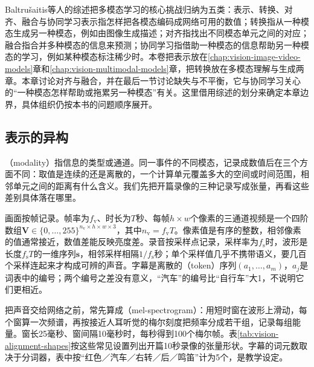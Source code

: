 Baltru\v{s}aitis等人的综述把多模态学习的核心挑战归纳为五类：表示、转换、对齐、融合与协同学习表示指怎样把各模态编码成网络可用的数值；转换指从一种模态生成另一种模态，例如由图像生成描述；对齐指找出不同模态单元之间的对应；融合指合并多种模态的信息来预测；协同学习指借助一种模态的信息帮助另一种模态的学习，例如某种模态标注稀少时。本卷把表示放在\ref{chap:vision-image-video-models}章和\ref{chap:vision-multimodal-models}章，把转换放在多模态理解与生成两章。本章讨论对齐与融合，并在最后一节讨论缺失与不平衡，它与协同学习关心的“一种模态怎样帮助或拖累另一种模态”有关。这里借用综述的划分来确定本章边界，具体组织仍按本书的问题顺序展开。

\subsection{表示的异构}
\label{sec:vision-alignment-heterogeneity}

（modality）指信息的类型或通道。同一事件的不同模态，记录成数值后在三个方面不同：取值是连续的还是离散的，一个计算单元覆盖多大的空间或时间范围，相邻单元之间的距离有什么含义。我们先把开篇录像的三种记录写成张量，再看这些差别具体落在哪里。

画面按帧记录。帧率为$f_{\mathrm v}$、时长为$T$秒、每帧$h\times w$个像素的三通道视频是一个四阶数组$\bm V\in\{0,\ldots,255\}^{n_{\mathrm v}\times h\times w\times 3}$，其中$n_{\mathrm v}=f_{\mathrm v}T$。像素值是有序的整数，相邻像素的值通常接近，数值差能反映亮度差。录音按采样点记录，采样率为$f_{\mathrm s}$时，波形是长度$f_{\mathrm s}T$的一维序列$\bm s$，相邻采样相隔$1/f_{\mathrm s}$秒；单个采样值几乎不携带语义，要几百个采样连起来才构成可辨的声音。字幕是离散的（token）序列$(a_1,\ldots,a_m)$，$a_j$是词表中的编号；两个编号之差没有意义，“汽车”的编号比“自行车”大1，不说明它们更相近。

把声音交给网络之前，常先算成（mel-spectrogram）：用短时窗在波形上滑动，每个窗算一次频谱，再按接近人耳听觉的梅尔刻度把频率分成若干组，记录每组能量。窗长25毫秒、窗间隔10毫秒时，每秒得到100个梅尔帧。表\ref{tab:vision-alignment-shapes}按这些常见设置列出开篇10秒录像的张量形状。字幕的词元数取决于分词器，表中按“红色／汽车／右转／后／鸣笛”计为5个，是教学设定。

